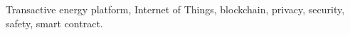 \documentclass[conference,10pt,letterpaper]{IEEEtran}
\begin{document}
\begin{IEEEkeywords}Transactive energy platform, Internet of Things, blockchain, privacy, security, safety, smart contract.\end{IEEEkeywords}


















 

\clearpage
%
\end{document}
